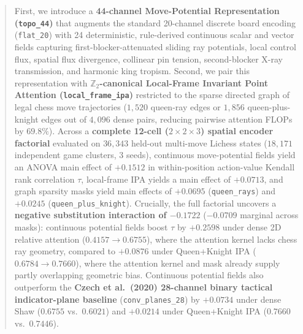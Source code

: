 \documentclass[10pt]{article}
\begin{document}
\begin{abstract}
First, we introduce a \textbf{44-channel Move-Potential Representation (\texttt{topo\_44})} that augments the standard 20-channel discrete board encoding (\texttt{flat\_20}) with 24 deterministic, rule-derived continuous scalar and vector fields capturing first-blocker-attenuated sliding ray potentials, local control flux, spatial flux divergence, collinear pin tension, second-blocker X-ray transmission, and harmonic king tropism. Second, we pair this representation with \textbf{$\mathbb{Z}_2$-canonical Local-Frame Invariant Point Attention (\texttt{local\_frame\_ipa})} restricted to the sparse directed graph of legal chess move trajectories ($1{,}520$ queen-ray edges or $1{,}856$ queen-plus-knight edges out of $4{,}096$ dense pairs, reducing pairwise attention FLOPs by \textbf{$69.8\%$}). Across a \textbf{complete 12-cell ($2 \times 2 \times 3$) spatial encoder factorial} evaluated on $36{,}343$ held-out multi-move Lichess states ($18{,}171$ independent game clusters, 3 seeds), continuous move-potential fields yield an ANOVA main effect of \textbf{$+0.1512$} in within-position action-value Kendall rank correlation $\tau$, local-frame IPA yields a main effect of \textbf{$+0.0713$}, and graph sparsity masks yield main effects of \textbf{$+0.0695$} (\texttt{queen\_rays}) and \textbf{$+0.0245$} (\texttt{queen\_plus\_knight}). Crucially, the full factorial uncovers a \textbf{negative substitution interaction of $-0.1722$} ($-0.0709$ marginal across masks): continuous potential fields boost $\tau$ by \textbf{$+0.2598$} under dense 2D relative attention ($0.4157 \to 0.6755$), where the attention kernel lacks chess ray geometry, compared to \textbf{$+0.0876$} under Queen+Knight IPA ($0.6784 \to 0.7660$), where the attention kernel and mask already supply partly overlapping geometric bias. Continuous potential fields also outperform the \textbf{Czech et al.\ (2020) 28-channel binary tactical indicator-plane baseline} (\texttt{conv\_planes\_28}) by \textbf{$+0.0734$} under dense Shaw ($0.6755$ vs.\ $0.6021$) and \textbf{$+0.0214$} under Queen+Knight IPA ($0.7660$ vs.\ $0.7446$).


\end{abstract}
\end{document}
